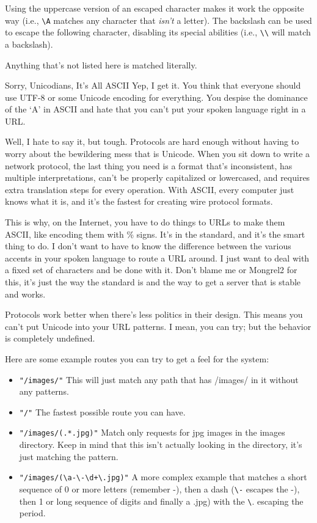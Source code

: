 Using the uppercase version of an escaped character makes it work the opposite
way (i.e., \verb|\A| matches any character that \emph{isn't} a letter). The backslash
can be used to escape the following character, disabling its special abilities (i.e.,
\verb|\\| will match a backslash).

Anything that's not listed here is matched literally.

\begin{aside}{Sorry, Unicodians, It's All ASCII}
Yep, I get it.  You think that everyone should use UTF-8 or some Unicode encoding for everything.
You despise the dominance of the `A' in ASCII and hate that you can't put your spoken language
right in a URL.

Well, I hate to say it, but tough.  Protocols are hard enough without having to
worry about the bewildering mess that is Unicode.  When you sit down to write a
network protocol, the last thing you need is a format that's inconsistent, has
multiple interpretations, can't be properly capitalized or lowercased, and
requires extra translation steps for every operation.  With ASCII, every
computer just knows what it is, and it's the fastest for creating wire protocol
formats.

This is why, on the Internet, you have to do things to URLs to make them ASCII,
like encoding them with \% signs.  It's in the standard, and it's the smart
thing to do.  I don't want to have to know the difference between the various
accents in your spoken language to route a URL around.  I just want to deal
with a fixed set of characters and be done with it.  Don't blame me or Mongrel2
for this, it's just the way the standard is and the way to get a server that is
stable and works.

Protocols work better when there's less politics in their design.  This means
you can't put Unicode into your URL patterns.  I mean, you can try; but the
behavior is completely undefined.
\end{aside}


Here are some example routes you can try to get a feel for the system:

\begin{itemize}
\item \verb|"/images/"|  This will just match any path that has /images/ in it without any patterns.
\item \verb|"/"| The fastest possible route you can have.
\item \verb|"/images/(.*.jpg)"| Match only requests for jpg images in the images directory.  Keep in mind that this
    isn't actually looking in the directory, it's just matching the  pattern.
\item \verb|"/images/(\a-\-\d+\.jpg)"| A more complex example that matches a short sequence of 0 or more letters (remember -), then a dash
    (\verb|\-| escapes the -), then 1 or long sequence of digits and finally a .jpg) with the \verb|\|. escaping the period.
\end{itemize}

